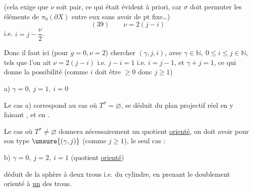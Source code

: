 

(cela exige que $\nu$ soit pair, ce qui était évident à priori, car $\sigma$ doit permuter les éléments de $\pi_0(\partial X)$ entre eux sans  avoir de pt fixe\ldots)
\[
(39)\qquad \nu=2(j-i)
\]
i.e. \uline{$i=j-\dfrac{\nu}{2}$}.

Donc il faut ici (pour $g=0,\nu=2$) chercher $(\gamma,j,i)$, avec $\gamma\in\mathbb N,\ 0\leq i\leq j\in\mathbb N$, tels que l'on ait $\nu=2(j-i)$ i.e. $j-i=1$ i.e. $i=j-1$, et $\gamma+j=1$, ce qui donne la  possibilité (comme $i$ doit être $\geq0$ donc $j\geq1$)

a) $\gamma=0,\ j=1,\ i=0$ 


Le cas a) correspond au cas où  $T^\sigma=\varnothing$,  se déduit du plan projectif réel en y faisant  ,  et en . 

Le cas où $T^\sigma\neq\varnothing$ donnera nécessairement un quotient  \uline{orienté}, on doit avoir pour son type $\unsure{(\gamma,j)}$ (comme $j\geq1$), le seul cas :


b) $\gamma=0,\ j=2,\ i=1$ (quotient \uline{orienté})

déduit de la sphère à deux trous i.e. du cylindre, en prenant le doublement orienté  à \uline{un} des trous. 

